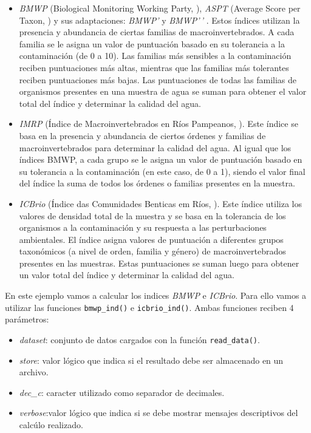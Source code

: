 \documentclass[
]{book}
\providecommand{\tightlist}{%
  \setlength{\itemsep}{0pt}\setlength{\parskip}{0pt}}
\begin{document}
\begin{itemize}
\item
  \emph{BMWP} (Biological Monitoring Working Party, \citep{armitage1983}), \emph{ASPT} (Average Score per Taxon, \citep{armitage1983}) y sus adaptaciones: \emph{BMWP'} \citep{alba1988} y \emph{BMWP'\,'} \citep{loyola2000}.
  Estos índices utilizan la presencia y abundancia de ciertas familias de macroinvertebrados.
  A cada familia se le asigna un valor de puntuación basado en su tolerancia a la contaminación (de 0 a 10).
  Las familias más sensibles a la contaminación reciben puntuaciones más altas, mientras que las familias más tolerantes reciben puntuaciones más bajas.
  Las puntuaciones de todas las familias de organismos presentes en una muestra de agua se suman para obtener el valor total del índice y determinar la calidad del agua.
\item
  \emph{IMRP} (Índice de Macroinvertebrados en Ríos Pampeanos, \citep{rodrigues1999}).
  Este índice se basa en la presencia y abundancia de ciertos órdenes y familias de macroinvertebrados para determinar la calidad del agua.
  Al igual que los índices BMWP, a cada grupo se le asigna un valor de puntuación basado en su tolerancia a la contaminación (en este caso, de 0 a 1), siendo el valor final del índice la suma de todos los órdenes o familias presentes en la muestra.
\item
  \emph{ICBrio} (Índice das Comunidades Benticas em Ríos, \citep{kuhlmann2012}).
  Este índice utiliza los valores de densidad total de la muestra y se basa en la tolerancia de los organismos a la contaminación y su respuesta a las perturbaciones ambientales.
  El índice asigna valores de puntuación a diferentes grupos taxonómicos (a nivel de orden, familia y género) de macroinvertebrados presentes en las muestras.
  Estas puntuaciones se suman luego para obtener un valor total del índice y determinar la calidad del agua.
\end{itemize}

En este ejemplo vamos a calcular los indices \emph{BMWP} e \emph{ICBrio}.
Para ello vamos a utilizar las funciones \texttt{bmwp\_ind()} e \texttt{icbrio\_ind()}.
Ambas funciones reciben 4 parámetros:

\begin{itemize}
\tightlist
\item
  \emph{dataset}: conjunto de datos cargados con la función \texttt{read\_data()}.
\item
  \emph{store}: valor lógico que indica si el resultado debe ser almacenado en un archivo.
\item
  \emph{dec\_c}: caracter utilizado como separador de decimales.
\item
  \emph{verbose}:valor lógico que indica si se debe mostrar mensajes descriptivos del calcúlo realizado.
\end{itemize}
\end{document}
